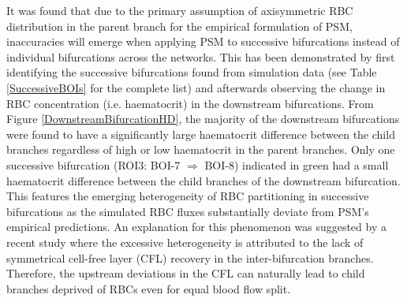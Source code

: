 \noindent It was found that due to the primary assumption of axisymmetric RBC distribution in the parent branch for the empirical formulation of PSM\cite{A.R.Pries2005Mbvi, PriesAR1990BFiM}, inaccuracies will emerge when applying PSM to successive bifurcations instead of individual bifurcations across the networks. This has been demonstrated by first identifying the successive bifurcations found from simulation data (see Table \ref{SuccessiveBOIs} for the complete list) and afterwards observing the change in RBC concentration (i.e. haematocrit) in the downstream bifurcations. From Figure \ref{DownstreamBifurcationHD}, the majority of the downstream bifurcations were found to have a significantly large haematocrit difference between the child branches regardless of high or low haematocrit in the parent branches. Only one successive bifurcation (ROI3: BOI-7 $\Rightarrow$ BOI-8) indicated in green had a small haematocrit difference between the child branches of the downstream bifurcation. This features the emerging heterogeneity of RBC partitioning in successive bifurcations as the simulated RBC fluxes substantially deviate from PSM's empirical predictions. An explanation for this phenomenon was suggested by a recent study\cite{Zhou2021EmergentBifurcations} where the excessive heterogeneity is attributed to the lack of symmetrical cell-free layer (CFL) recovery in the inter-bifurcation branches. Therefore, the upstream deviations in the CFL can naturally lead to child branches deprived of RBCs even for equal blood flow split. 

